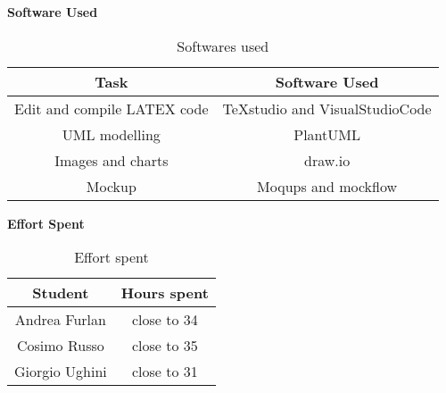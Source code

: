 \begin{flushleft}
\textbf{Software Used}
\end{flushleft}
\begin{table}[htp]
	\centering
		\begin{tabular}{|c|c|}
			\hline
			Task&Software Used\\
			\hline
			Edit and compile LATEX code&TeXstudio and VisualStudioCode\\
			\hline
			UML modelling&PlantUML\\
			\hline
			Images and charts&draw.io\\
			\hline
			Mockup&Moqups and mockflow\\
			\hline
		\end{tabular}
	\caption{Softwares used} 
\end{table}
\begin{flushleft}
\textbf{Effort Spent}
\end{flushleft}
\begin{table}[htp]
	\centering
		\begin{tabular}{|c|c|}
			\hline
			Student&Hours spent\\
			\hline
			Andrea Furlan&close to 34\\
			\hline
			Cosimo Russo&close to 35\\
			\hline
			Giorgio Ughini&close to 31\\
			\hline
		\end{tabular}
	\caption{Effort spent} 
\end{table}